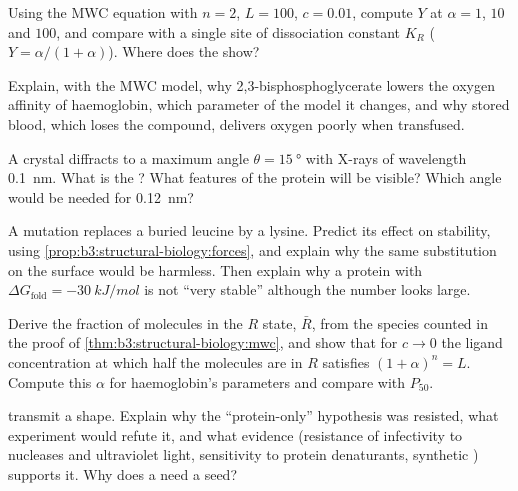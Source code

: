 \begin{exercise}[$\star\star$]\label{exo:b3:structural-biology:6}
Using the MWC equation with $n = 2$, $L = 100$, $c = 0.01$, compute
$Y$ at $\alpha = 1$, $10$ and $100$, and compare with a single site of
dissociation constant $K_{R}$ ($Y = \alpha/(1+\alpha)$). Where does the
 show?
\end{exercise}

\begin{exercise}[$\star\star$]\label{exo:b3:structural-biology:7}
Explain, with the MWC model, why 2,3-bisphosphoglycerate lowers the
oxygen affinity of haemoglobin, which parameter of the model it
changes, and why stored blood, which loses the compound, delivers
oxygen poorly when transfused.
\end{exercise}

\begin{exercise}[$\star\star$]\label{exo:b3:structural-biology:8}
A crystal diffracts to a maximum angle $\theta = \qty{15}{\degree}$
with X-rays of wavelength \qty{0.1}{nm}. What is the ? What
features of the protein will be visible? Which angle would be needed
for \qty{0.12}{nm}?
\end{exercise}

\begin{exercise}[$\star\star$]\label{exo:b3:structural-biology:9}
A mutation replaces a buried leucine by a lysine. Predict its effect
on stability, using \cref{prop:b3:structural-biology:forces}, and
explain why the same substitution on the surface would be harmless.
Then explain why a protein with $\Delta G_{\text{fold}} =
\qty{-30}{kJ/mol}$ is not ``very stable'' although the number looks
large.
\end{exercise}

\begin{exercise}[$\star\star\star$]\label{exo:b3:structural-biology:10}
Derive the fraction of molecules in the $R$ state, $\bar R$, from the
species counted in the proof of \cref{thm:b3:structural-biology:mwc},
and show that for $c \to 0$ the ligand concentration at which half the
molecules are in $R$ satisfies $(1+\alpha)^{n} = L$. Compute this
$\alpha$ for haemoglobin's parameters and compare with $P_{50}$.
\end{exercise}

\begin{exercise}[$\star\star\star$]\label{exo:b3:structural-biology:11}
 transmit a shape. Explain why the ``protein-only'' hypothesis
was resisted, what experiment would refute it, and what evidence
(resistance of infectivity to nucleases and ultraviolet light,
sensitivity to protein denaturants, synthetic ) supports it. Why
does a  need a seed?
\end{exercise}

